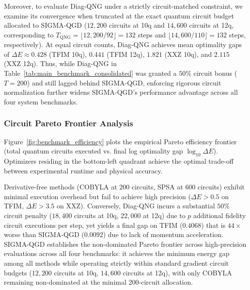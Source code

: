 \documentclass[11pt,a4paper]{article}
\begin{document}
Moreover, to evaluate Diag-QNG under a strictly circuit-matched constraint, we examine its convergence when truncated at the exact quantum circuit budget allocated to SIGMA-QGD ($12,200$ circuits at 10q and $14,600$ circuits at 12q, corresponding to $T_{\text{QNG}} = \lfloor 12,200/92 \rfloor = 132$ steps and $\lfloor 14,600/110 \rfloor = 132$ steps, respectively). At equal circuit counts, Diag-QNG achieves mean optimality gaps of $\Delta E \approx 0.428$ (TFIM 10q), $0.441$ (TFIM 12q), $1.821$ (XXZ 10q), and $2.115$ (XXZ 12q). Thus, while Diag-QNG in Table~\ref{tab:main_benchmark_consolidated} was granted a $50\%$ circuit bonus ($T=200$) and still lagged behind SIGMA-QGD, enforcing rigorous circuit normalization further widens SIGMA-QGD's performance advantage across all four system benchmarks.

\subsubsection{Circuit Pareto Frontier Analysis}
Figure~\ref{fig:benchmark_efficiency} plots the empirical Pareto efficiency frontier (total quantum circuits executed vs. final log optimality gap $\log_{10} \Delta E$). Optimizers residing in the bottom-left quadrant achieve the optimal trade-off between experimental runtime and physical accuracy.

Derivative-free methods (COBYLA at $200$ circuits, SPSA at $600$ circuits) exhibit minimal execution overhead but fail to achieve high precision ($\Delta E > 0.5$ on TFIM, $\Delta E > 3.5$ on XXZ). Conversely, Diag-QNG incurs a substantial $50\%$ circuit penalty ($18,400$ circuits at 10q, $22,000$ at 12q) due to $p$ additional fidelity circuit executions per step, yet yields a final gap on TFIM ($0.4068$) that is $44\times$ worse than SIGMA-QGD ($0.0092$) due to lack of momentum acceleration. SIGMA-QGD establishes the non-dominated Pareto frontier across high-precision evaluations across all four benchmarks: it achieves the minimum energy gap among all methods while operating strictly within standard gradient circuit budgets ($12,200$ circuits at 10q, $14,600$ circuits at 12q), with only COBYLA remaining non-dominated at the minimal 200-circuit allocation.
\end{document}
